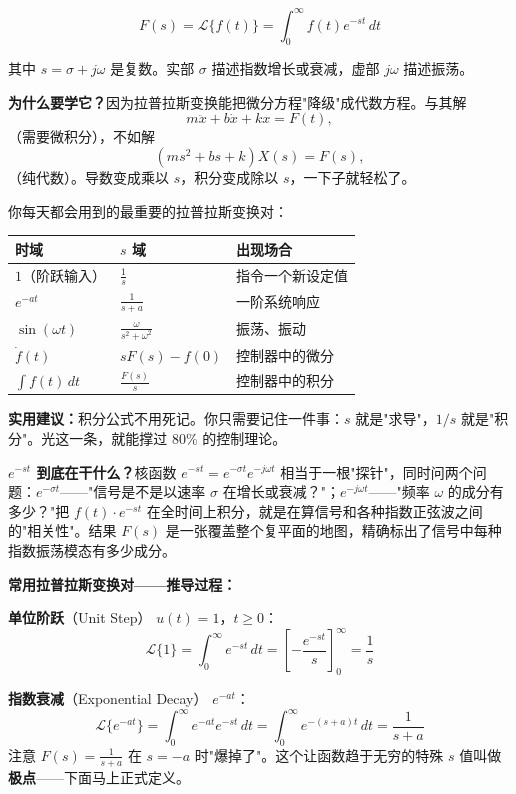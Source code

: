 \begin{equation}
F(s) = \mathcal{L}\{f(t)\} = \int_0^{\infty} f(t) e^{-st} \, dt
\end{equation}

其中 $s = \sigma + j\omega$ 是复数。实部 $\sigma$ 描述指数增长或衰减，虚部 $j\omega$ 描述振荡。

\textbf{为什么要学它？}因为拉普拉斯变换能把微分方程"降级"成代数方程。与其解
\[
m\ddot{x} + b\dot{x} + kx = F(t),
\]
（需要微积分），不如解
\[
(ms^2 + bs + k)X(s) = F(s),
\]
（纯代数）。导数变成乘以 $s$，积分变成除以 $s$，一下子就轻松了。

你每天都会用到的最重要的拉普拉斯变换对：

\begin{center}
\begin{tabular}{lll}
\toprule
\textbf{时域} & \textbf{$s$ 域} & \textbf{出现场合} \\
\midrule
$1$（阶跃输入） & $\frac{1}{s}$ & 指令一个新设定值 \\
$e^{-at}$ & $\frac{1}{s+a}$ & 一阶系统响应 \\
$\sin(\omega t)$ & $\frac{\omega}{s^2 + \omega^2}$ & 振荡、振动 \\
$\dot{f}(t)$ & $sF(s) - f(0)$ & 控制器中的微分 \\
$\int f(t)\,dt$ & $\frac{F(s)}{s}$ & 控制器中的积分 \\
\bottomrule
\end{tabular}
\end{center}

\textbf{实用建议：}积分公式不用死记。你只需要记住一件事：$s$ 就是"求导"，$1/s$ 就是"积分"。光这一条，就能撑过 80\% 的控制理论。

\textbf{$e^{-st}$ 到底在干什么？}核函数 $e^{-st} = e^{-\sigma t} e^{-j\omega t}$ 相当于一根"探针"，同时问两个问题：$e^{-\sigma t}$——"信号是不是以速率 $\sigma$ 在增长或衰减？"；$e^{-j\omega t}$——"频率 $\omega$ 的成分有多少？"把 $f(t) \cdot e^{-st}$ 在全时间上积分，就是在算信号和各种指数正弦波之间的"相关性"。结果 $F(s)$ 是一张覆盖整个复平面的地图，精确标出了信号中每种指数振荡模态有多少成分。

\textbf{常用拉普拉斯变换对——推导过程：}

\textbf{单位阶跃}（Unit Step） $u(t) = 1$，$t \geq 0$：
\[
\mathcal{L}\{1\} = \int_0^{\infty} e^{-st} \, dt = \left[-\frac{e^{-st}}{s}\right]_0^{\infty} = \frac{1}{s}
\]

\textbf{指数衰减}（Exponential Decay） $e^{-at}$：
\[
\mathcal{L}\{e^{-at}\} = \int_0^{\infty} e^{-at} e^{-st} \, dt = \int_0^{\infty} e^{-(s+a)t} \, dt = \frac{1}{s+a}
\]
注意 $F(s) = \frac{1}{s+a}$ 在 $s = -a$ 时"爆掉了"。这个让函数趋于无穷的特殊 $s$ 值叫做\textbf{极点}——下面马上正式定义。

